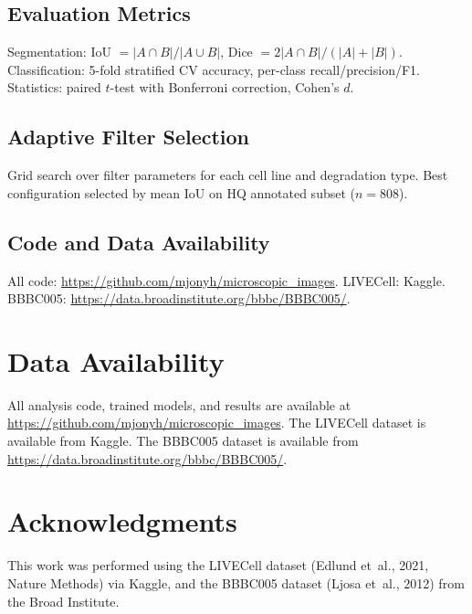\documentclass[11pt,a4paper]{article}
\newcommand{\etal}{et~al.\xspace}
\begin{document}
\subsection{Evaluation Metrics}
Segmentation: IoU $= |A \cap B| / |A \cup B|$, Dice $= 2|A \cap B| / (|A| + |B|)$. Classification: 5-fold stratified CV accuracy, per-class recall/precision/F1. Statistics: paired $t$-test with Bonferroni correction, Cohen's $d$.

\subsection{Adaptive Filter Selection}
Grid search over filter parameters for each cell line and degradation type. Best configuration selected by mean IoU on HQ annotated subset ($n{=}808$).

\subsection{Code and Data Availability}
All code: \url{https://github.com/mjonyh/microscopic_images}. LIVECell: Kaggle. BBBC005: \url{https://data.broadinstitute.org/bbbc/BBBC005/}.




\section*{Data Availability}
All analysis code, trained models, and results are available at \url{https://github.com/mjonyh/microscopic_images}. The LIVECell dataset is available from Kaggle. The BBBC005 dataset is available from \url{https://data.broadinstitute.org/bbbc/BBBC005/}.

\section*{Acknowledgments}
This work was performed using the LIVECell dataset (Edlund \etal, 2021, Nature Methods) via Kaggle, and the BBBC005 dataset (Ljosa \etal, 2012) from the Broad Institute.
\end{document}
